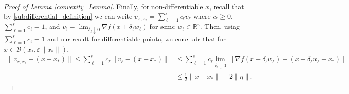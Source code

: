 \documentclass[11pt]{article}
\newcommand{\R}{\mathbb{R}}
\renewcommand{\epsilon}{\varepsilon}
\begin{document}
\begin{proof}[Proof of Lemma \ref{convexity_Lemma}]
    Finally, for non-differentiable $x$, recall that by \eqref{subdifferential_definition} we can write $v_{x,x_*} = \sum_{\ell=1}^s c_{\ell}v_{\ell}$ where $c_{\ell} \geqslant 0$, $\sum_{\ell=1}^s  c_{\ell} = 1$, and $v_{\ell} =\lim_{\delta_{\ell} \downarrow 0} \nabla f(x+\delta_{\ell} w_{\ell})$ for some $w_{\ell}\in \R^n$. Then, using $\sum_{\ell=1}^s c_{\ell}=1$ and our result for differentiable points, we conclude that for $x \in \mathcal{B}(x_*,\epsilon\|x_*\|)$,
    \begin{align*}
        \|v_{x,x_*} - (x-x_*)\| \leqslant \sum_{\ell=1}^s c_{\ell}\|v_{\ell}-(x-x_*)\| 
        & \leqslant \sum_{\ell=1}^s c_{\ell} \lim_{\delta_{\ell}\downarrow 0}\|\nabla f(x+\delta_{\ell} w_{\ell}) - (x+\delta_{\ell}w_{\ell}-x_*)\| \\
        & \leqslant \frac{1}{2}\|x-x_*\| + 2\|\eta\|.
    \end{align*} \end{proof}
    
\end{document}
